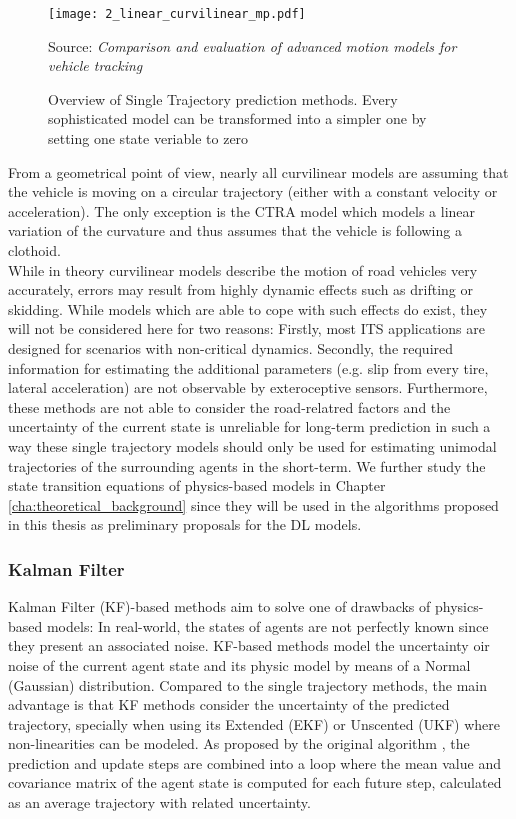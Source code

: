 \begin{figure}[h]
	\centering
	\texttt{[image: 2\_linear\_curvilinear\_mp.pdf]}
	\caption[Overview of Single Trajectory prediction methods]{Overview of Single Trajectory prediction methods. Every sophisticated model can be transformed into a simpler one by setting one state veriable to zero}
	Source: \textit{Comparison and evaluation of advanced motion models for vehicle tracking} \cite{schubert2008comparison}
	\label{fig:2_linear_curvilinear_mp}
\end{figure}

From a geometrical point of view, nearly all curvilinear models are assuming that the vehicle is moving on a circular trajectory (either with a constant velocity or acceleration). The only exception is the CTRA model which models a linear variation of the curvature and thus assumes that the vehicle is following a clothoid. \\

While in theory curvilinear models describe the motion of road vehicles very accurately, errors may result from highly dynamic effects such as drifting or skidding. While models which are able to cope with such effects do exist, they will not be considered here for two reasons: Firstly, most \ac{ITS} applications are designed for scenarios with non-critical dynamics. Secondly, the required information for estimating the additional parameters (e.g. slip from every tire, lateral acceleration) are not observable by exteroceptive sensors. Furthermore, these methods are not able to consider the road-relatred factors and the uncertainty of the current state is unreliable for long-term prediction in such a way these single trajectory models should only be used for estimating unimodal trajectories of the surrounding agents in the short-term. We further study the state transition equations of physics-based models in Chapter \ref{cha:theoretical_background} since they will be used in the algorithms proposed in this thesis as preliminary proposals for the \ac{DL} models.

\subsubsection{Kalman Filter}
\label{subsubsec:2_kalman_filter_mp}

Kalman Filter (KF)-based methods aim to solve one of drawbacks of physics-based models: In real-world, the states of agents are not perfectly known since they present an associated noise. KF-based methods model the uncertainty oir noise of the current agent state and its physic model by means of a Normal (Gaussian) distribution. Compared to the single trajectory methods, the main advantage is that KF methods consider the uncertainty of the predicted trajectory, specially when using its Extended (EKF) or Unscented (UKF) where non-linearities can be modeled. As proposed by the original algorithm \cite{kalman1960new}, the prediction and update steps are combined into a loop where the mean value and covariance matrix of the agent state is computed for each future step, calculated as an average trajectory with related uncertainty. \\

